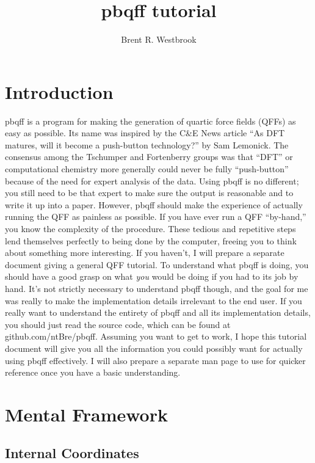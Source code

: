 \documentclass{article}
\title{pbqff tutorial}
\author{Brent R. Westbrook}
\begin{document}
\maketitle

\section{Introduction}

pbqff is a program for making the generation of quartic force fields
(QFFs) as easy as possible. Its name was inspired by the C\&E News
article ``As DFT matures, will it become a push-button technology?''
by Sam Lemonick. The consensus among the Tschumper and Fortenberry
groups was that ``DFT'' or computational chemistry more generally
could never be fully ``push-button'' because of the need for expert
analysis of the data. Using pbqff is no different; you still need to
be that expert to make sure the output is reasonable and to write it
up into a paper. However, pbqff should make the experience of actually
running the QFF as painless as possible. If you have ever run a QFF
``by-hand,'' you know the complexity of the procedure. These tedious
and repetitive steps lend themselves perfectly to being done by the
computer, freeing you to think about something more interesting. If
you haven't, I will prepare a separate document giving a general QFF
tutorial. To understand what pbqff is doing, you should have a good
grasp on what \textit{you} would be doing if you had to its job by
hand. It's not strictly necessary to understand pbqff though, and the
goal for me was really to make the implementation details irrelevant
to the end user. If you really want to understand the entirety of
pbqff and all its implementation details, you should just read the
source code, which can be found at github.com/ntBre/pbqff. Assuming
you want to get to work, I hope this tutorial document will give you
all the information you could possibly want for actually using pbqff
effectively. I will also prepare a separate man page to use for
quicker reference once you have a basic understanding.

\section{Mental Framework}

\subsection{Internal Coordinates}
\end{document}

